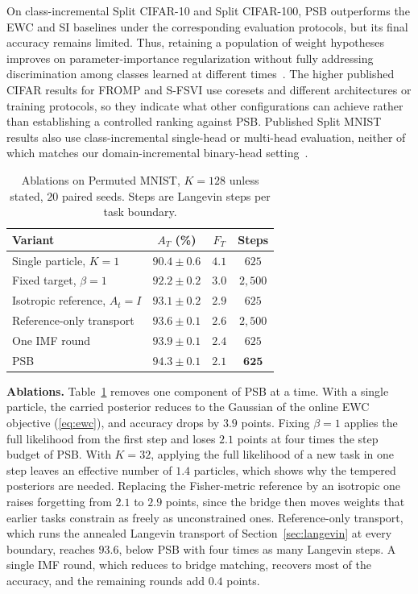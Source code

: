 On class-incremental Split CIFAR-10 and Split CIFAR-100, PSB outperforms
the EWC and SI baselines under the corresponding evaluation protocols,
but its final accuracy remains limited. Thus, retaining a population of
weight hypotheses improves on parameter-importance regularization without
fully addressing discrimination among classes learned at different
times~\cite{vandeven2022types}.
The higher published CIFAR results for FROMP and S-FSVI use coresets
and different architectures or training protocols, so they indicate what other
configurations can achieve rather than establishing a controlled ranking
against PSB. Published Split MNIST results also use class-incremental
single-head or multi-head evaluation, neither of which matches our
domain-incremental binary-head setting~\cite{swaroop2019improving,rudner2022sfsvi}.

\begin{table}[t]
\centering
\caption{Ablations on Permuted MNIST, $K=128$ unless stated, $20$ paired seeds.
Steps are Langevin steps per task boundary.}
\label{tab:ablations}
\setlength{\tabcolsep}{3.2pt}
\begin{tabular}{lccc}
\hline
Variant & $A_T$ (\%) & $F_T$ & Steps \\
\hline
Single particle, $K=1$        & $90.4\pm0.6$ & $4.1$ & $625$ \\
Fixed target, $\beta=1$       & $92.2\pm0.2$ & $3.0$ & $2{,}500$ \\
Isotropic reference, $A_t=I$  & $93.1\pm0.2$ & $2.9$ & $625$ \\
Reference-only transport      & $93.6\pm0.1$ & $2.6$ & $2{,}500$ \\
One IMF round                 & $93.9\pm0.1$ & $2.4$ & $625$ \\
\hline
PSB                           & $\mathbf{94.3\pm0.1}$ & $\mathbf{2.1}$
                              & $\mathbf{625}$ \\
\hline
\end{tabular}
\end{table}

\textbf{Ablations.} Table~\ref{tab:ablations} removes one component of PSB at a
time. With a single particle, the carried posterior reduces to the Gaussian of
the online EWC objective (\ref{eq:ewc}), and accuracy drops by $3.9$
points. Fixing $\beta=1$ applies the full likelihood from the first step and
loses $2.1$ points at four times the step budget of PSB. With $K=32$,
applying the full likelihood of a new task in one step leaves an effective
number of $1.4$ particles, which shows why the tempered posteriors are
needed. Replacing
the Fisher-metric reference by an isotropic one raises forgetting from
$2.1$ to $2.9$ points, since the bridge then moves weights that
earlier tasks constrain as freely as unconstrained ones. Reference-only
transport, which runs the annealed Langevin transport of
Section~\ref{sec:langevin} at every boundary, reaches $93.6$, below PSB
with four times as many Langevin steps. A single IMF round, which reduces to
bridge matching, recovers most of the accuracy, and the remaining rounds add
$0.4$ points.

